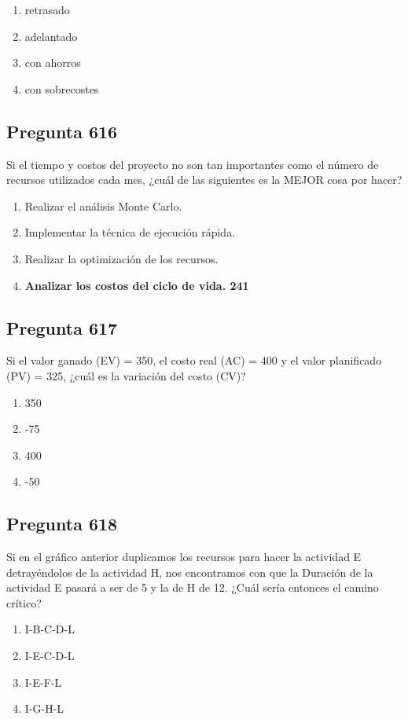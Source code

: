 \documentclass[11pt,a4paper]{article}
\begin{document}
\begin{enumerate}[label=\alph*)]
  \item retrasado
  \item adelantado
  \item con ahorros
  \item con sobrecostes
\end{enumerate}

\subsection*{Pregunta 616}
Si el tiempo y costos del proyecto no son tan importantes como el número de recursos utilizados cada mes, ¿cuál de las siguientes es la MEJOR cosa por hacer?

\begin{enumerate}[label=\alph*)]
  \item Realizar el análisis Monte Carlo.
  \item Implementar la técnica de ejecución rápida.
  \item Realizar la optimización de los recursos.
  \item \textbf{Analizar los costos del ciclo de vida. 241}
\end{enumerate}

\subsection*{Pregunta 617}
Si el valor ganado (EV) = 350, el costo real (AC) = 400 y el valor planificado (PV) = 325, ¿cuál es la variación del costo (CV)?

\begin{enumerate}[label=\alph*)]
  \item 350
  \item -75
  \item 400
  \item -50
\end{enumerate}

\subsection*{Pregunta 618}
Si en el gráfico anterior duplicamos los recursos para hacer la actividad E detrayéndolos de la actividad H, nos encontramos con que la Duración de la actividad E pasará a ser de 5 y la de H de 12. ¿Cuál sería entonces el camino crítico?

\begin{enumerate}[label=\alph*)]
  \item I-B-C-D-L
  \item I-E-C-D-L
  \item I-E-F-L
  \item I-G-H-L
\end{enumerate}
\end{document}
